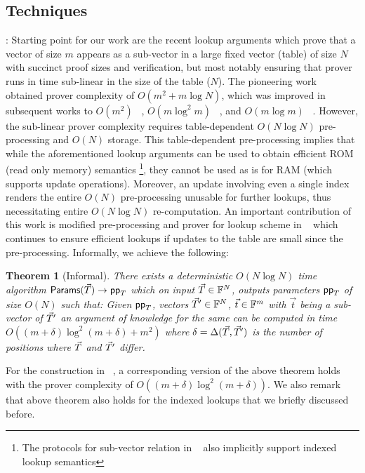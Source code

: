 \documentclass[11pt]{article}
\newtheorem{theorem}{Theorem}[section]
\begin{document}
    \subsection{Techniques}\label{subsec:techniques}
    : Starting point for our work are the recent lookup arguments which prove that a vector of size $m$ appears as
    a sub-vector in a large fixed vector (table) of size $N$ with succinct proof sizes and verification, but most notably
    ensuring that prover runs in time sub-linear in the size of the table ($N$). The pioneering work ~\cite{CCS:ZBKMNS22}
    obtained prover complexity of $O(m^2+m\log N)$, which was improved in subsequent works to $O(m^2)$ ~\cite{EPRINT:PosKat22},
    $O(m\log^2 m)$ ~\cite{EPRINT:ZGKMR22}, and $O(m\log m)$ ~\cite{EPRINT:EagFioGab22}. However, the sub-linear prover
    complexity requires table-dependent $O(N\log N)$ pre-processing and $O(N)$ storage. This table-dependent
    pre-processing implies that while
    the aforementioned lookup arguments can be used to obtain efficient ROM (read only memory) semantics
    \footnote{The protocols for sub-vector relation in ~\cite{CCS:ZBKMNS22, EPRINT:ZGKMR22} also implicitly support indexed lookup semantics},
    they cannot be used as is for RAM (which supports update operations). Moreover, an update involving even a single
    index renders the entire $O(N)$ pre-processing unusable for further lookups, thus necessitating entire $O(N\log N)$
     re-computation. An important contribution of this work is modified pre-processing and prover for lookup scheme
    in ~\cite{EPRINT:PosKat22} which continues to ensure efficient lookups if updates to the table are small since the pre-processing.
    Informally, we achieve the following:

    \begin{theorem}[Informal]\label{thm:pre-process}
        There exists a deterministic $O(N\log N)$ time algorithm $\textsf{Params}(\vec{T})\rightarrow \mathsf{pp}_T$
        which on input $\vec{T}\in \mathbb{F}^N$, outputs parameters $\mathsf{pp}_T$ of size $O(N)$ such
        that: Given $\mathsf{pp}_T$, vectors $\vec{T}'\in \mathbb{F}^N$, $\vec{t}\in \mathbb{F}^m$ with $\vec{t}$ being a sub-vector of $\vec{T}'$
        an argument of knowledge for the same can be computed in time
        $O((m+\delta)\log^2 (m+\delta) + m^2)$ where $\delta=\Delta(\vec{T}, \vec{T}')$
    is the number of positions where $\vec{T}$ and $\vec{T}'$ differ.
    \end{theorem}
    For the construction in ~\cite{EPRINT:EagFioGab22}, a corresponding version of the above theorem holds with the prover complexity
    of $O((m+\delta)\log^2(m+\delta))$. We also remark that above theorem also holds for the indexed lookups that we briefly discussed before.\smallskip
\end{document}
